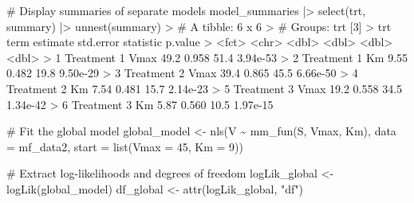 \documentclass[
  letterpaper,
]{book}
\newenvironment{Shaded}{\begin{snugshade}}{\end{snugshade}}
\newcommand{\AttributeTok}[1]{\textcolor[rgb]{0.40,0.45,0.13}{#1}}
\newcommand{\CommentTok}[1]{\textcolor[rgb]{0.37,0.37,0.37}{#1}}
\newcommand{\DecValTok}[1]{\textcolor[rgb]{0.68,0.00,0.00}{#1}}
\newcommand{\ErrorTok}[1]{\textcolor[rgb]{0.68,0.00,0.00}{#1}}
\newcommand{\FloatTok}[1]{\textcolor[rgb]{0.68,0.00,0.00}{#1}}
\newcommand{\FunctionTok}[1]{\textcolor[rgb]{0.28,0.35,0.67}{#1}}
\newcommand{\NormalTok}[1]{\textcolor[rgb]{0.00,0.23,0.31}{#1}}
\newcommand{\OtherTok}[1]{\textcolor[rgb]{0.00,0.23,0.31}{#1}}
\newcommand{\SpecialCharTok}[1]{\textcolor[rgb]{0.37,0.37,0.37}{#1}}
\newcommand{\StringTok}[1]{\textcolor[rgb]{0.13,0.47,0.30}{#1}}
\begin{document}
\begin{Shaded}
\begin{Highlighting}[]
\CommentTok{\# Display summaries of separate models}
\NormalTok{model\_summaries }\SpecialCharTok{|\textgreater{}}
  \FunctionTok{select}\NormalTok{(trt, summary) }\SpecialCharTok{|\textgreater{}}
  \FunctionTok{unnest}\NormalTok{(summary)}
\SpecialCharTok{\textgreater{}} \CommentTok{\# A tibble: 6 x 6}
\ErrorTok{\textgreater{}} \CommentTok{\# Groups:   trt [3]}
\ErrorTok{\textgreater{}}\NormalTok{   trt         term  estimate std.error statistic  p.value}
\SpecialCharTok{\textgreater{}}   \ErrorTok{\textless{}}\NormalTok{fct}\SpecialCharTok{\textgreater{}}       \ErrorTok{\textless{}}\NormalTok{chr}\SpecialCharTok{\textgreater{}}    \ErrorTok{\textless{}}\NormalTok{dbl}\SpecialCharTok{\textgreater{}}     \ErrorTok{\textless{}}\NormalTok{dbl}\SpecialCharTok{\textgreater{}}     \ErrorTok{\textless{}}\NormalTok{dbl}\SpecialCharTok{\textgreater{}}    \ErrorTok{\textless{}}\NormalTok{dbl}\SpecialCharTok{\textgreater{}}
\ErrorTok{\textgreater{}} \DecValTok{1}\NormalTok{ Treatment }\DecValTok{1}\NormalTok{ Vmax     }\FloatTok{49.2}      \FloatTok{0.958}      \FloatTok{51.4} \FloatTok{3.94e{-}53}
\SpecialCharTok{\textgreater{}} \DecValTok{2}\NormalTok{ Treatment }\DecValTok{1}\NormalTok{ Km        }\FloatTok{9.55}     \FloatTok{0.482}      \FloatTok{19.8} \FloatTok{9.50e{-}29}
\SpecialCharTok{\textgreater{}} \DecValTok{3}\NormalTok{ Treatment }\DecValTok{2}\NormalTok{ Vmax     }\FloatTok{39.4}      \FloatTok{0.865}      \FloatTok{45.5} \FloatTok{6.66e{-}50}
\SpecialCharTok{\textgreater{}} \DecValTok{4}\NormalTok{ Treatment }\DecValTok{2}\NormalTok{ Km        }\FloatTok{7.54}     \FloatTok{0.481}      \FloatTok{15.7} \FloatTok{2.14e{-}23}
\SpecialCharTok{\textgreater{}} \DecValTok{5}\NormalTok{ Treatment }\DecValTok{3}\NormalTok{ Vmax     }\FloatTok{19.2}      \FloatTok{0.558}      \FloatTok{34.5} \FloatTok{1.34e{-}42}
\SpecialCharTok{\textgreater{}} \DecValTok{6}\NormalTok{ Treatment }\DecValTok{3}\NormalTok{ Km        }\FloatTok{5.87}     \FloatTok{0.560}      \FloatTok{10.5} \FloatTok{1.97e{-}15}

\CommentTok{\# Fit the global model}
\NormalTok{global\_model }\OtherTok{\textless{}{-}} \FunctionTok{nls}\NormalTok{(V }\SpecialCharTok{\textasciitilde{}} \FunctionTok{mm\_fun}\NormalTok{(S, Vmax, Km),}
                    \AttributeTok{data =}\NormalTok{ mf\_data2,}
                    \AttributeTok{start =} \FunctionTok{list}\NormalTok{(}\AttributeTok{Vmax =} \DecValTok{45}\NormalTok{, }\AttributeTok{Km =} \DecValTok{9}\NormalTok{))}

\CommentTok{\# Extract log{-}likelihoods and degrees of freedom}
\NormalTok{logLik\_global }\OtherTok{\textless{}{-}} \FunctionTok{logLik}\NormalTok{(global\_model)}
\NormalTok{df\_global }\OtherTok{\textless{}{-}} \FunctionTok{attr}\NormalTok{(logLik\_global, }\StringTok{"df"}\NormalTok{)}


\end{Highlighting}
\end{Shaded}
\end{document}
